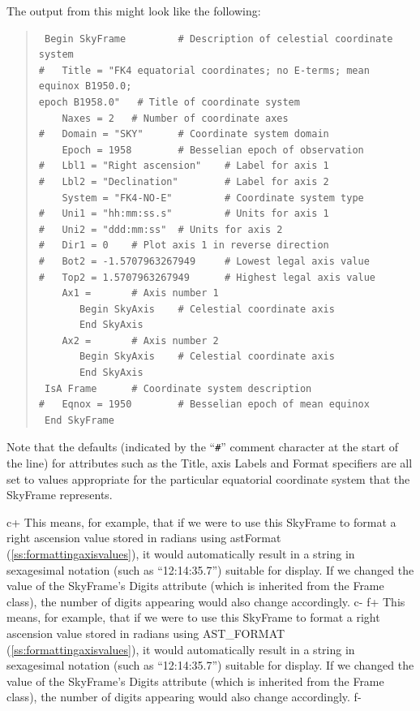 \documentclass[twoside,11pt]{article}
\newcommand{\secref}[1]{\S\ref{#1}}
\renewcommand{\secref}[1]{\ref{#1}}
\begin{document}
The output from this might look like the following:

\begin{quote}
\begin{verbatim}
 Begin SkyFrame         # Description of celestial coordinate system
#   Title = "FK4 equatorial coordinates; no E-terms; mean equinox B1950.0; 
epoch B1958.0"   # Title of coordinate system
    Naxes = 2   # Number of coordinate axes
#   Domain = "SKY"      # Coordinate system domain
    Epoch = 1958        # Besselian epoch of observation
#   Lbl1 = "Right ascension"    # Label for axis 1
#   Lbl2 = "Declination"        # Label for axis 2
    System = "FK4-NO-E"         # Coordinate system type
#   Uni1 = "hh:mm:ss.s"         # Units for axis 1
#   Uni2 = "ddd:mm:ss"  # Units for axis 2
#   Dir1 = 0    # Plot axis 1 in reverse direction
#   Bot2 = -1.5707963267949     # Lowest legal axis value
#   Top2 = 1.5707963267949      # Highest legal axis value
    Ax1 =       # Axis number 1
       Begin SkyAxis    # Celestial coordinate axis
       End SkyAxis
    Ax2 =       # Axis number 2
       Begin SkyAxis    # Celestial coordinate axis
       End SkyAxis
 IsA Frame      # Coordinate system description
#   Eqnox = 1950        # Besselian epoch of mean equinox
 End SkyFrame
\end{verbatim}
\end{quote}

Note that the defaults (indicated by the ``\verb?#?'' comment
character at the start of the line) for attributes such as the Title,
axis Labels and Format specifiers are all set to values appropriate
for the particular equatorial coordinate system that the SkyFrame
represents.

c+
This means, for example, that if we were to use this SkyFrame to
format a right ascension value stored in radians using astFormat
(\secref{ss:formattingaxisvalues}), it would automatically result in a
string in sexagesimal notation (such as ``12:14:35.7'') suitable for
display.  If we changed the value of the SkyFrame's Digits attribute
(which is inherited from the Frame class), the number of digits
appearing would also change accordingly.
c-
f+
This means, for example, that if we were to use this SkyFrame to
format a right ascension value stored in radians using AST\_FORMAT
(\secref{ss:formattingaxisvalues}), it would automatically result in a
string in sexagesimal notation (such as ``12:14:35.7'') suitable for
display.  If we changed the value of the SkyFrame's Digits attribute
(which is inherited from the Frame class), the number of digits
appearing would also change accordingly.
f-
\end{document}
